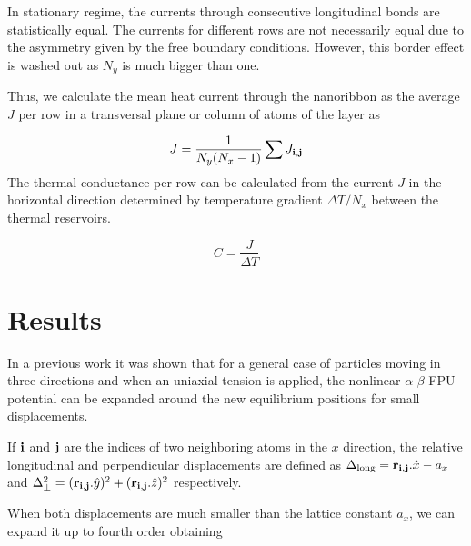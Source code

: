 \documentclass[12pt]{article}
\begin{document}
In stationary regime, the currents through consecutive longitudinal bonds are statistically equal. The currents for different rows are not necessarily equal due to the asymmetry given by the free boundary conditions. However, this border effect is washed out as $N_y$ is much bigger than one.

Thus, we calculate the mean heat current through the nanoribbon as the average $J$ per row in a transversal plane or column of atoms of the layer as

\begin{equation}
J = \frac{1}{N_{y} (N_{x}-1)}\sum J_{\bf i,j}
\end{equation}
The thermal conductance per row can be calculated from the current $J$ in the horizontal direction determined by temperature gradient $\Delta T / N_x$ between the thermal reservoirs. 

\begin{equation}
C = \frac{J}{\Delta T}
\label{k}
\end{equation}

\section{Results}

In a previous work \cite{nuestroJSM} it was shown that for a general case of particles moving in three directions and when an uniaxial tension is applied, the nonlinear $\alpha$-$\beta$ FPU potential can be expanded around the new equilibrium positions for small displacements. 

If ${\bf i}$ and ${\bf j}$ are the indices of two neighboring atoms in the $x$ direction, the relative longitudinal and perpendicular displacements are defined as $\Delta_{\text{long}} = {\bf r}_{\bf{i,j}}.\hat{x} - a_x$ and $\Delta^2_{\bot} = ({\bf r}_{\bf{i,j}}.\hat{y})^2  + ({\bf r}_{\bf{i,j}}.\hat{z})^2 $ respectively. 


When both displacements are much smaller than the lattice constant $a_x$, we can expand it up to fourth order obtaining
\end{document}
